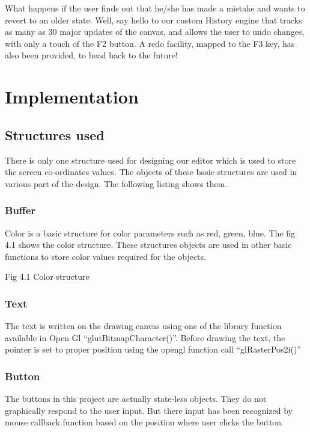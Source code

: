 \documentclass[12pt]{report}
\begin{document}
What happens if the user finds out that he/she has made a mistake and wants to revert to an older state. Well, say hello to our custom History engine that tracks as many as 30 major updates of the canvas, and allows the user to undo changes, with only a touch of the F2 button. A redo facility, mapped to the F3 key, has also been provided, to head back to the future!




\pagestyle{fancy}
\chead{}
\rfoot{\small{\thepage}}
\renewcommand{\headrulewidth}{0.4pt}
\renewcommand{\footrulewidth}{0.4pt}
\chapter{Implementation}

\section{Structures used}
There is only one  structure used for designing our editor which is used to store the screen co-ordinates  values. The objects of these basic structures are used in various part of the design. The following listing shows them.

\subsection{Buffer}
Color is a basic structure for color parameters such as red, green, blue. The fig 4.1 shows the color structure. These structures objects are used in other basic functions to store color values required for the objects.
 
Fig 4.1 Color structure

\subsection{Text}
The text is written on the drawing canvas using one of the library function available in Open Gl “glutBitmapCharacter()”.
Before drawing the text, the pointer is set to proper position using the opengl function call “glRasterPos2i()”

\subsection{Button}
The buttons in this project are actually state-less objects. They do not graphically respond to the user input. But there input has been recognized by mouse callback function based on the position where user clicks the button.
\end{document}
